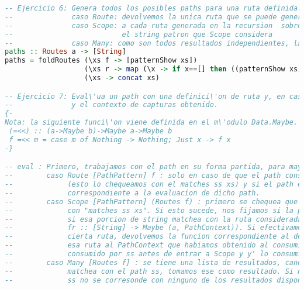 \documentclass[10pt,a4paper]{article}
\begin{document}
\begin{lstlisting}[language=Haskell,breaklines=true,basicstyle=\tiny]
-- Ejercicio 6: Genera todos los posibles paths para una ruta definida.
--              caso Route: devolvemos la unica ruta que se puede generar
--              caso Scope: a cada ruta generada en la recursion  sobre la ruta que toma Scope como parametro, se le agrega adelante
--                          el string patron que Scope considera
--              caso Many: como son todos resultados independientes, la concatenacion de estos son todos los paths que se pueden generar
paths :: Routes a -> [String]
paths = foldRoutes (\xs f -> [patternShow xs]) 
                   (\xs r -> map (\x -> if x==[] then ((patternShow xs) ++ x) else (((patternShow xs) ++ "/") ++ x)) r) 
                   (\xs -> concat xs)

-- Ejercicio 7: Eval\'ua un path con una definici\'on de ruta y, en caso de haber coincidencia, obtiene el handler correspondiente 
--              y el contexto de capturas obtenido.
{-
Nota: la siguiente funci\'on viene definida en el m\'odulo Data.Maybe.
 (=<<) :: (a->Maybe b)->Maybe a->Maybe b
 f =<< m = case m of Nothing -> Nothing; Just x -> f x
-}

-- eval : Primero, trabajamos con el path en su forma partida, para mayor prolijidad del codigo
--        caso Route [PathPattern] f : solo en caso de que el path considerado (ss) alcance para consumir todo el [PathPattern] considerado (xs),
--             (esto lo chequeamos con el matches ss xs) y si el path en consumido en su totalidad (null x), entonces devolvemos la funcion
--             correspondiente a la evaluacion de dicho path.
--        caso Scope [PathPattern] (Routes f) : primero se chequea que el path ss que nos pasan matchee con el [PathPattern] xs. Esto lo hacemos
--             con "matches ss xs". Si esto sucede, nos fijamos si la porcion del path ss que no se pudo consumir con xs (en el codigo, la x),
--             si esa porcion de string matchea con la ruta considerada dentro del Scope. Esto lo chequeamos con r (notar que 
--             fr :: [String] -> Maybe (a, PathContext)). Si efectivamente, en la recursion se logra matchear lo que queda del string ss con 
--             cierta ruta, devolvemos la funcion correspondiente al desarrollo de dicha ruta, y concatenamos al PathContext generado por 
--             esa ruta al PathContext que habiamos obtenido al consumir el path ss que nos habian pasado. Esto lo hacemos con y++y', donde y es lo
--             consumido por ss antes de entrar a Scope y y' lo consumido por ss ya dentro de la ruta del Scope. 
--        caso Many [Routes f] : se tiene una lista de resultados, candidatos a matchear con el path que nos pasan. si alguno de estos 
--             matchea con el path ss, tomamos ese como resultado. Si no matchea con ninguno, devuelve Nothing pues quiere decir que el path
--             ss no se corresonde con ninguno de los resultados disponibles. Notar que fx :: String -> Maybe (a,PathContext)


\end{lstlisting}
\end{document}
